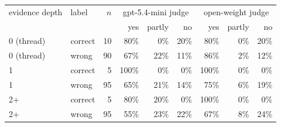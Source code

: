 \begin{tabular}{llrrrrrrr}
\toprule
evidence depth & label & $n$ & \multicolumn{3}{c}{gpt-5.4-mini judge} & \multicolumn{3}{c}{open-weight judge} \\
 & & & yes & partly & no & yes & partly & no \\
\midrule
0 (thread) & correct & 10 & 80\% & 0\% & 20\% & 80\% & 0\% & 20\% \\
0 (thread) & wrong & 90 & 67\% & 22\% & 11\% & 86\% & 2\% & 12\% \\
1 & correct & 5 & 100\% & 0\% & 0\% & 100\% & 0\% & 0\% \\
1 & wrong & 95 & 65\% & 21\% & 14\% & 75\% & 6\% & 19\% \\
2+ & correct & 5 & 80\% & 20\% & 0\% & 100\% & 0\% & 0\% \\
2+ & wrong & 95 & 55\% & 23\% & 22\% & 67\% & 8\% & 24\% \\
\bottomrule
\end{tabular}
